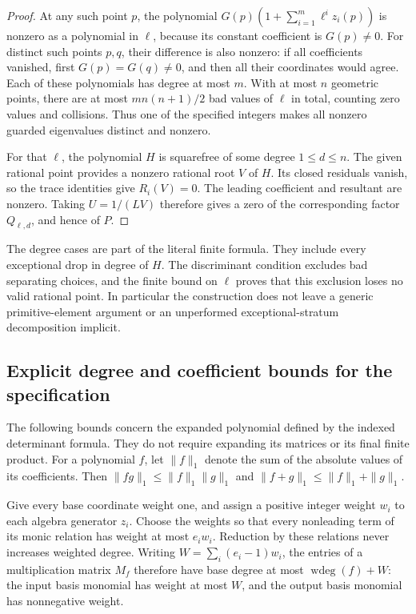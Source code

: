 \documentclass[11pt]{article}
\theoremstyle{definition}
\begin{document}
\begin{proof}
At any such point $p$, the polynomial
$G(p)(1+\sum_{i=1}^m\ell^i z_i(p))$ is nonzero as a polynomial
in $\ell$, because its constant coefficient is $G(p)\ne0$.
For distinct such points $p,q$, their difference is also nonzero:
if all coefficients vanished, first $G(p)=G(q)\ne0$, and then
all their coordinates would agree. Each of these polynomials has
degree at most $m$. With at most $n$ geometric points, there are
at most $m n(n+1)/2$ bad values of $\ell$ in total, counting zero
values and collisions. Thus one of the specified integers makes
all nonzero guarded eigenvalues distinct and nonzero.

For that $\ell$, the polynomial $H$ is squarefree of some degree
$1\le d\le n$. The given rational point provides a nonzero
rational root $V$ of $H$. Its closed residuals vanish, so the trace
identities give $R_i(V)=0$. The leading coefficient and resultant
are nonzero. Taking $U=1/(LV)$ therefore gives a zero of the
corresponding factor $Q_{\ell,d}$, and hence of $P$.
\end{proof}

The degree cases are part of the literal finite formula. They include
every exceptional drop in degree of $H$. The discriminant condition
excludes bad separating choices, and the finite bound on $\ell$ proves
that this exclusion loses no valid rational point. In particular the
construction does not leave a generic primitive-element argument or an
unperformed exceptional-stratum decomposition implicit.


\subsection{Explicit degree and coefficient bounds for the specification}
\label{subsec:finite-algebra-bounds}

The following bounds concern the expanded polynomial defined by the
indexed determinant formula. They do not require expanding its matrices
or its final finite product. For a polynomial $f$, let $\|f\|_1$ denote
the sum of the absolute values of its coefficients. Then
$\|fg\|_1\le\|f\|_1\|g\|_1$ and
$\|f+g\|_1\le\|f\|_1+\|g\|_1$.

Give every base coordinate weight one, and assign a positive integer
weight $w_i$ to each algebra generator $z_i$. Choose the weights so that
every nonleading term of its monic relation has weight at most
$e_iw_i$. Reduction by these relations never increases weighted degree.
Writing $W=\sum_i(e_i-1)w_i$, the entries of a multiplication matrix
$M_f$ therefore have base degree at most $\operatorname{wdeg}(f)+W$:
the input basis monomial has weight at most $W$, and the output basis
monomial has nonnegative weight.
\end{document}
